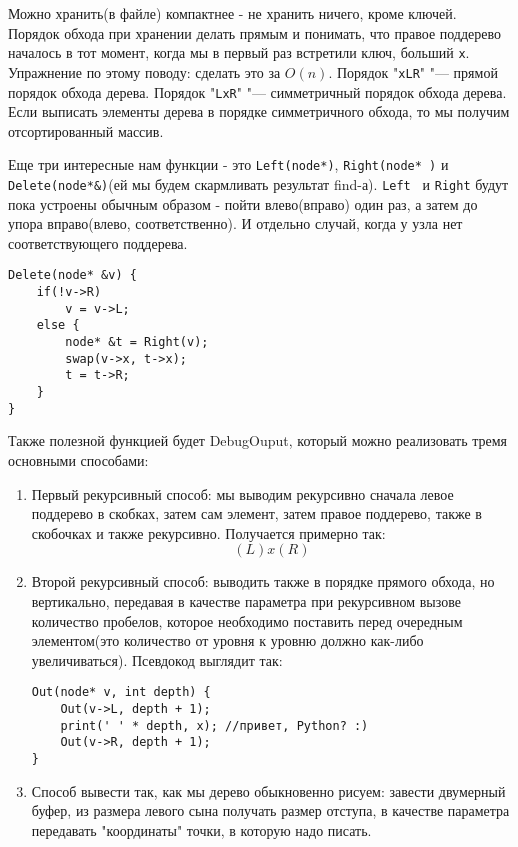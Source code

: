 Можно хранить(в файле) компактнее - не хранить ничего, кроме ключей. Порядок обхода при хранении делать прямым и понимать, что правое поддерево началось в тот момент, когда мы в первый раз встретили ключ, больший \texttt{x}. Упражнение по этому поводу: сделать  это за $O(n)$.
\Def Порядок "\texttt{xLR}" "--- прямой порядок обхода дерева.
\Def Порядок "\texttt{LxR}" "--- симметричный порядок обхода дерева.
\Rem Если выписать элементы дерева в порядке симметричного обхода, то мы получим отсортированный массив.

Еще три интересные нам функции - это \texttt{Left(node*)}, \texttt{Right(node* )} и \texttt{Delete(node*&)}(ей мы будем скармливать результат find-а). \texttt{Left } и \texttt{Right} будут пока устроены обычным образом - пойти влево(вправо) один раз, а затем до упора вправо(влево, соответственно). И отдельно случай, когда у узла нет соответствующего поддерева.

\begin{verbatim}
Delete(node* &v) {
	if(!v->R)
		v = v->L;
	else {
		node* &t = Right(v);
		swap(v->x, t->x);
		t = t->R;
	}
}
\end{verbatim}
Также полезной функцией будет DebugOuput, который можно реализовать тремя основными способами:
\begin{enumerate}
\item Первый рекурсивный способ: мы выводим рекурсивно сначала левое поддерево в скобках, затем сам элемент, затем правое поддерево, также в скобочках и также рекурсивно. Получается примерно так:
\[ (L) x (R) \]
\item Второй рекурсивный способ: выводить также в порядке прямого обхода, но вертикально, передавая в качестве параметра при рекурсивном вызове количество пробелов, которое необходимо поставить перед очередным элементом(это количество от уровня к уровню должно как-либо увеличиваться). Псевдокод выглядит так:
\begin{verbatim}
Out(node* v, int depth) {
	Out(v->L, depth + 1);
	print(' ' * depth, x); //привет, Python? :)
	Out(v->R, depth + 1);
}
\end{verbatim}
\item Способ вывести так, как мы дерево обыкновенно рисуем: завести двумерный буфер, из размера левого сына получать размер отступа, в качестве параметра передавать "координаты" точки, в которую надо писать.
\end{enumerate}

